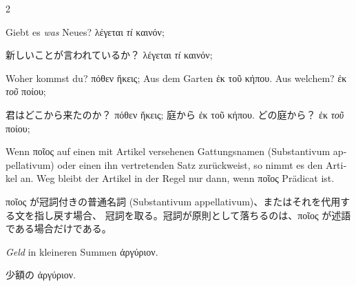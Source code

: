 \begin{paracol}{2}
\begin{enumerate}[leftmargin=0pt,rightmargin=0pt,listparindent =1cm,labelindent=1cm,labelsep=1ex,labelwidth={*},itemindent={*},align=left]
\begin{german}
\begin{continuousitemline}Giebt es \emph{was} Neues? \textgreek[variant=ancient]{λέγεται
\emph{τί} καινόν;}\par\end{continuousitemline}
\end{german}
\switchcolumn

\begin{japanese}
新しいことが言われているか？ \textgreek[variant=ancient]{λέγεται
\emph{τί} καινόν;}
\end{japanese}
\switchcolumn*

\begin{german}
\item Woher kommst du? \textgreek[variant=ancient]{πόθεν ἥκεις;} Aus dem
Garten \textgreek[variant=ancient]{ἐκ τοῦ κήπου.} Aus welchem? \textgreek[variant=ancient]{ἐκ
\emph{τοῦ} ποίου;}
\end{german}
\switchcolumn

\begin{japanese}
君はどこから来たのか？ \textgreek[variant=ancient]{πόθεν ἥκεις;}
庭から \textgreek[variant=ancient]{ἐκ τοῦ κήπου.} どの庭から？
\textgreek[variant=ancient]{ἐκ \emph{τοῦ} ποίου;}
\end{japanese}
\switchcolumn*

\begin{german}
Wenn \textgreek[variant=ancient]{ποῖος} auf einen mit Artikel versehenen
Gattungsnamen \textlatin{(Substantivum appellativum)} oder einen ihn
vertretenden Satz zurückweist, so nimmt es den Artikel an. Weg bleibt
der Artikel in der Regel nur dann, wenn \textgreek[variant=ancient]{ποῖος}
Prädicat ist. 
\end{german}
\switchcolumn

\begin{japanese}
\textgreek[variant=ancient]{ποῖος} が冠詞付きの普通名詞
\textlatin{(Substantivum appellativum)}、またはそれを代用する文を指し戻す場合、
冠詞を取る。冠詞が原則として落ちるのは、\textgreek[variant=ancient]{ποῖος} が述語である場合だけである。
\end{japanese}
\switchcolumn*

\begin{german}
\item \emph{Geld} in kleineren Summen \textgreek[variant=ancient]{ἀργύριον.}
\end{german}
\switchcolumn

\begin{japanese}
少額の \textgreek[variant=ancient]{ἀργύριον.}
\end{japanese}
\switchcolumn*


\end{enumerate}
\end{paracol}

